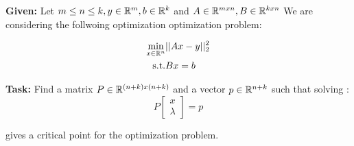 \textbf{Given:} Let $m \leq n \leq k, y \in \mathbb{R}^m, b\in \mathbb{R}^k$ and $A \in \mathbb{R}^{mxn},B \in \mathbb{R}^{kxn}$
We are considering the follwoing optimization optimization problem:

\begin{align*}
    \min_{x \in \mathbb{R}^n} &||Ax-y||_2^2\\
    \text{s.t.}              & Bx=b  
\end{align*}

\textbf{Task:} Find a matrix $P \in \mathbb{R}^{(n+k)x(n+k)}$ and a vector $p \in \mathbb{R}^{n+k}$ such that solving :
\[
P  \begin{bmatrix}  x \\ \lambda \end{bmatrix} =p   
\]

gives a critical point for the optimization problem.

